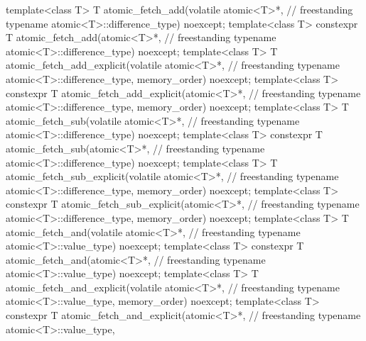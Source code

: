 \begin{codeblock}
{  template<class T>
    T atomic_fetch_add(volatile atomic<T>*,                                         // freestanding
                       typename atomic<T>::difference_type) noexcept;
  template<class T>
    constexpr T atomic_fetch_add(atomic<T>*,                                        // freestanding
                                 typename atomic<T>::difference_type) noexcept;
  template<class T>
    T atomic_fetch_add_explicit(volatile atomic<T>*,                                // freestanding
                                typename atomic<T>::difference_type,
                                memory_order) noexcept;
  template<class T>
    constexpr T atomic_fetch_add_explicit(atomic<T>*,                               // freestanding
                                          typename atomic<T>::difference_type,
                                          memory_order) noexcept;
  template<class T>
    T atomic_fetch_sub(volatile atomic<T>*,                                         // freestanding
                       typename atomic<T>::difference_type) noexcept;
  template<class T>
    constexpr T atomic_fetch_sub(atomic<T>*,                                        // freestanding
                                 typename atomic<T>::difference_type) noexcept;
  template<class T>
    T atomic_fetch_sub_explicit(volatile atomic<T>*,                                // freestanding
                                typename atomic<T>::difference_type,
                                memory_order) noexcept;
  template<class T>
    constexpr T atomic_fetch_sub_explicit(atomic<T>*,                               // freestanding
                                          typename atomic<T>::difference_type,
                                          memory_order) noexcept;
  template<class T>
    T atomic_fetch_and(volatile atomic<T>*,                                         // freestanding
                       typename atomic<T>::value_type) noexcept;
  template<class T>
    constexpr T atomic_fetch_and(atomic<T>*,                                        // freestanding
                                 typename atomic<T>::value_type) noexcept;
  template<class T>
    T atomic_fetch_and_explicit(volatile atomic<T>*,                                // freestanding
                                typename atomic<T>::value_type,
                                memory_order) noexcept;
  template<class T>
    constexpr T atomic_fetch_and_explicit(atomic<T>*,                               // freestanding
                                          typename atomic<T>::value_type,
}
\end{codeblock}
